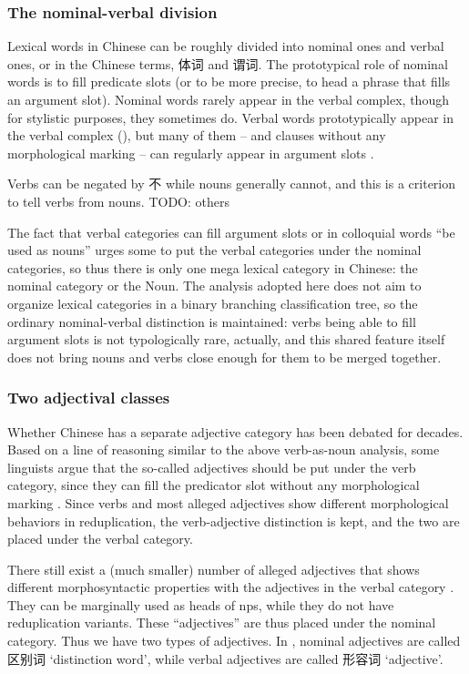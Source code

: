 \documentclass[UTF8, a4paper, oneside, scheme=plain, 12pt]{ctexrep}
\newcommand*{\citesec}[1]{\S~{#1}}
\newcommand*{\citechap}[1]{chap.~{#1}}
\newcommand{\translate}[1]{`#1'}
\begin{document}
\subsubsection{The nominal-verbal division}

Lexical words in Chinese can be roughly divided into nominal ones and verbal ones,
or in the Chinese terms, 体词 and 谓词.
The prototypical role of nominal words 
is to fill predicate slots (or to be more precise, to head a phrase that fills an argument slot).
Nominal words rarely appear in the verbal complex,
though for stylistic purposes, they sometimes do.
Verbal words prototypically appear in the verbal complex
(),
but many of them -- and clauses without any morphological marking -- 
can regularly appear in argument slots \citep[\citesec{3.5}]{zhudexigrammar}.

Verbs can be negated by 不 while nouns generally cannot, 
and this is a criterion to tell verbs from nouns. TODO: others

The fact that verbal categories can fill argument slots or in colloquial words ``be used as nouns''
urges some to put the verbal categories under the nominal categories,
so thus there is only one mega lexical category in Chinese:
the nominal category or the Noun.
The analysis adopted here does not aim to organize lexical categories 
in a binary branching classification tree,
so the ordinary nominal-verbal distinction is maintained:
verbs being able to fill argument slots is not typologically rare, actually,
and this shared feature itself does not bring nouns and verbs close enough 
for them to be merged together.

\subsubsection{Two adjectival classes}

Whether Chinese has a separate adjective category 
has been debated for decades.
Based on a line of reasoning similar to the above verb-as-noun analysis,
some linguists argue that the so-called adjectives should be put under the verb category,
since they can fill the predicator slot without any morphological marking \citep{li1989mandarin}.
Since verbs and most alleged adjectives show different morphological behaviors in reduplication, %
the verb-adjective distinction is kept,
and the two are placed under the verbal category.

There still exist a (much smaller) number of alleged adjectives that shows 
different morphosyntactic properties with the adjectives in the verbal category 
\citep[\citechap{5}]{paul2014new}.
They can be marginally used as heads of \ac{np}s,
while they do not have reduplication variants.
These ``adjectives'' are thus placed under the nominal category.
Thus we have two types of adjectives.
In \citet{zhudexigrammar}, 
nominal adjectives are called 区别词 \translate{distinction word},
while verbal adjectives are called 形容词 \translate{adjective}.
\end{document}
